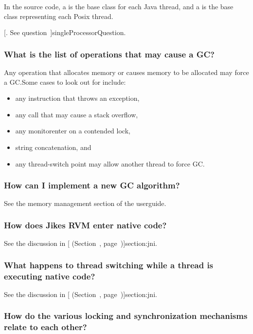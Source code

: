 In the source code, a 
is the base class for each Java
thread, and a 
is the base class representing each
Posix thread.  

[.  See 
question~\Ref]{singleProcessorQuestion}.

\subsubsection{What is the list of operations that may cause a GC?}

Any operation that allocates memory or causes memory to be allocated may
force a GC.\@  Some cases to look out for include:
\begin{itemize}
\item any instruction that throws an exception,
\item any call that may cause a stack overflow,
\item any monitorenter on a contended lock,
\item string concatenation, and
\item any thread-switch point may allow another thread to force GC.\@
\end{itemize}

\subsubsection{How can I implement a new GC algorithm?}

See the memory management section of the userguide.

\subsubsection{How does Jikes RVM enter native code?}

See the discussion in [
  (Section~\Ref, page~\Pageref)]{section:jni}. 

\subsubsection{What happens to thread switching while a thread is
executing native code?}
See the discussion in [ (Section~\Ref, page~\Pageref)]{section:jni}. 

\subsubsection{How do the various locking and synchronization mechanisms
relate to each other?}

